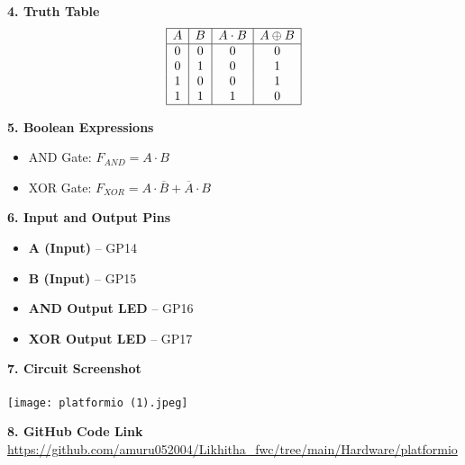 \documentclass[12pt]{article}
\begin{document}
\begin{multicols}{2}
\vspace{1em}
\noindent\textbf{4. Truth Table}
\[
\begin{array}{|c|c|c|c|}
\hline
A & B & A \cdot B & A \oplus B \\
\hline
0 & 0 & 0 & 0 \\
0 & 1 & 0 & 1 \\
1 & 0 & 0 & 1 \\
1 & 1 & 1 & 0 \\
\hline
\end{array}
\]

\vspace{1em}
\noindent\textbf{5. Boolean Expressions}
\begin{itemize}
    \item AND Gate: \( F_{AND} = A \cdot B \)
    \item XOR Gate: \( F_{XOR} = A \cdot \overline{B} + \overline{A} \cdot B \)
\end{itemize}

\end{multicols}

\vspace{3em}
\noindent\textbf{6. Input and Output Pins}
\begin{itemize}
    \item \textbf{A (Input)} – GP14
    \item \textbf{B (Input)} – GP15
    \item \textbf{AND Output LED} – GP16
    \item \textbf{XOR Output LED} – GP17
\end{itemize}

\vspace{1em}
\noindent\textbf{7. Circuit Screenshot} \\
\\
\texttt{[image: platformio (1).jpeg]} %

\vspace{1em}


\vspace{1em}
\noindent\textbf{8. GitHub Code Link} \\
\url{https://github.com/amuru052004/Likhitha_fwc/tree/main/Hardware/platformio}
\end{document}
